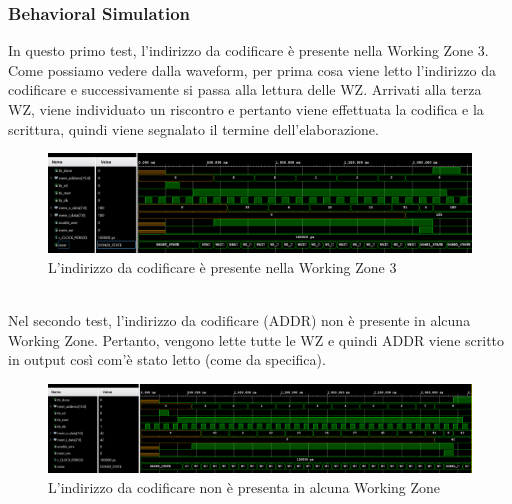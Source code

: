 \documentclass{article}
\begin{document}
\subsubsection{Behavioral Simulation}
In questo primo test, l'indirizzo da codificare è presente nella Working Zone 3. Come possiamo vedere dalla waveform, per prima cosa viene letto l'indirizzo da codificare e successivamente si passa alla lettura delle WZ. Arrivati alla terza WZ, viene individuato un riscontro e pertanto viene effettuata la codifica e la scrittura, quindi viene segnalato il termine dell'elaborazione.\\
\begin{figure}[H]
    \centering
    \includegraphics[width=1.0\textwidth]{images/test-in-wz.png}
    \caption{L'indirizzo da codificare è presente nella Working Zone 3}
    \label{fig:test-in-wz}
\end{figure}
\noindent\\ Nel secondo test, l'indirizzo da codificare (ADDR) non è presente in alcuna Working Zone. Pertanto, vengono lette tutte le WZ e quindi ADDR viene scritto in output così com'è stato letto (come da specifica).\\
\begin{figure}[H]
    \centering
    \includegraphics[width=1.0\textwidth]{images/test-no-wz.png}
    \caption{L'indirizzo da codificare non è presenta in alcuna Working Zone}
    \label{fig:test-no-wz}
\end{figure}
\end{document}
